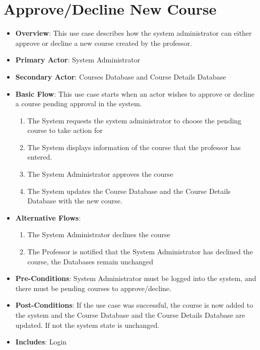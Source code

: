\documentclass[12pt, a4]{report}
\begin{document}
\section{Approve/Decline New Course}
\begin{itemize}
    \item \textbf{Overview}: This use case describes how the system administrator can either approve or decline a new course created by the professor.
    \item \textbf{Primary Actor}: System Administrator
    \item \textbf{Secondary Actor}: Courses Database and Course Details Database
    \item \textbf{Basic Flow}: This use case starts when an actor wishes to approve or decline a course pending approval in the system.
        \begin{enumerate}
            \item The System requests the system administrator to choose the pending course to take action for
            \item The System displays information of the course that the professor has entered.
            \item The System Administrator approves the course
            \item The System updates the Course Database and the Course Details Database with the new course.
        \end{enumerate}
    \item \textbf{Alternative Flows}:
        \begin{enumerate}
            \item The System Administrator declines the course
            \item The Professor is notified that the System Administrator has declined the course, the Databases remain unchanged
        \end{enumerate}
    \item \textbf{Pre-Conditions}: System Administrator must be logged into the system, and there must be pending courses to approve/decline.
    \item \textbf{Post-Conditions}: If the use case was successful, the course is now added to the system and the Course Database and the Course Details Database are updated. If not the system state is unchanged.
    \item \textbf{Includes}: Login
\end{itemize}
\end{document}
